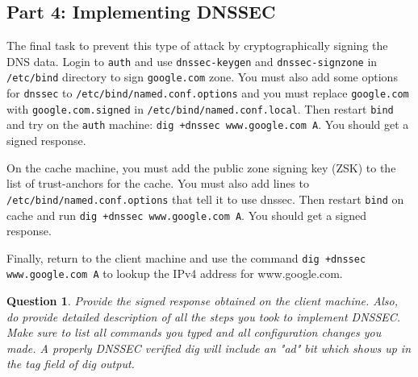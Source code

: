 \documentclass[a4paper,11pt,hidelinks]{article}
\newtheorem{theorem}{Question}[subsection]
\begin{document}
\clearpage
\newpage
\subsection{Part 4: Implementing DNSSEC}

The final task to prevent this type of attack by cryptographically signing the DNS data. Login to \verb=auth= and use \verb=dnssec-keygen= and \verb=dnssec-signzone= in \verb=/etc/bind= directory to sign \verb=google.com= zone. You must also add some options for \verb=dnssec= to \verb=/etc/bind/named.conf.options= and you must replace \verb=google.com= with \verb=google.com.signed= in \verb=/etc/bind/named.conf.local=. Then restart \verb=bind= and try on the \verb=auth= machine: \verb=dig +dnssec www.google.com A=. You should get a signed response.

On the cache machine, you must add the public zone signing key (ZSK) to the list of trust-anchors for the cache. You must also add lines to \verb=/etc/bind/named.conf.options= that tell it to use dnssec. Then restart \verb=bind= on cache and run \verb=dig +dnssec www.google.com A=. You should get a signed response.

Finally, return to the client machine and use the command \verb=dig +dnssec www.google.com A= to lookup the IPv4 address for www.google.com.

\begin{theorem}
    Provide the signed response obtained on the client machine. Also, do provide detailed description of all the steps you took to implement DNSSEC. Make sure to list all commands you typed and all configuration changes you made. A properly DNSSEC verified dig will include an "ad" bit which shows up in the tag field of dig output.
\end{theorem}
\end{document}
